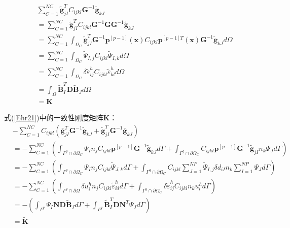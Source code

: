 \begin{equation}\label{CH4-K}
\begin{split}
    &\sum_{C=1}^{N\!C}\tilde{\pmb g}^T_{jI}C_{ijkl}\pmb{G}^{-1}\tilde{\pmb g}_{kJ}\\
&=\sum_{C=1}^{N\!C}\tilde{\pmb g}^T_{jI}C_{ijkl}\pmb{G}^{-1}\pmb{G}\pmb{G}^{-1}\tilde{\pmb g}_{kJ}\\
&=\sum_{C=1}^{N\!C}\int_{\Omega_C}\tilde{\pmb g}_{jI}^T\pmb{G}^{-1}\pmb{p}^{[p-1]}(\pmb x)C_{ijkl}\pmb{p}^{[p-1]T}(\pmb{x})\pmb{G}^{-1}\tilde{\pmb g}_{kJ}d\Omega\\
&=\sum_{C=1}^{N\!C}\int_{\Omega_C}\tilde{\Psi}_{I,j}C_{ijkl}\tilde{\Psi}_{I,k}d\Omega\\
&=\sum_{C=1}^{N\!C}\int_{\Omega_C}\delta\tilde{\varepsilon}_{ij}^hC_{ijkl}\tilde{\varepsilon}_{kl}^hd\Omega\\
&=\int_{\Omega}\tilde{\pmb{B}}_I^T\pmb{D}\tilde{\pmb{B}}_Jd\Omega\\
&=\pmb{K}
\end{split}
\end{equation}
\par
式(\ref{Ehr21})中的一致性刚度矩阵$\tilde{\pmb{K}}$：
\begin{equation}\label{CH4-tildeK}
\begin{split}
    &-\sum_{C=1}^{N\!C}C_{ijkl}(\bar{\pmb g}_{jI}^T\pmb{G}^{-1}\tilde{\pmb g}_{kJ}+\tilde{\pmb g}_{jI}^T\pmb{G}^{-1}\bar{\pmb g}_{kJ})\\
    &=-\sum_{C=1}^{N\!C}(\int_{\Gamma^g\cap\partial\Omega_C}\Psi_In_jC_{ijkl}\pmb{p}^{[p-1]}\pmb{G}^{-1}\tilde{\pmb g}_{kJ}d\Gamma
    +\int_{\Gamma^g\cap\partial\Omega_C}C_{ijkl}\pmb{p}^{[p-1]}\pmb{G}^{-1}\tilde{\pmb g}_{jI}n_k\Psi_Jd\Gamma)\\
    &=-\sum_{C=1}^{N\!C}(\int_{\Gamma^g\cap\partial\Omega_C}\Psi_In_jC_{ijkl}\tilde{\Psi}_{J,k}d\Gamma
    +\int_{\Gamma^g\cap\partial\Omega_C}C_{ijkl}\sum_{J=1}^{N\!P}\tilde{\Psi}_{I,j}\delta d_{iI}n_k\sum_{I=1}^{N\!P}\Psi_Jd\Gamma)\\
    &=-\sum_{C=1}^{N\!C}(\int_{\Gamma^g\cap\partial\Omega}\delta u_i^hn_jC_{ijkl}\tilde{\varepsilon}_{kl}^hd\Gamma+\int_{\Gamma^g\cap\partial\Omega_C}\delta\tilde{\varepsilon}_{ij}^hC_{ijkl}n_ku^h_ld\Gamma)\\
    &=-(\int_{\Gamma^g}\Psi_I\pmb{N}\pmb{D}\tilde{\pmb{B}}_Jd\Gamma+\int_{\Gamma^g}\tilde{\pmb{B}}_I^T\pmb{D}\pmb{N}^T\Psi_Jd\Gamma)\\
    &=\tilde{\pmb{K}}
\end{split}
\end{equation}
